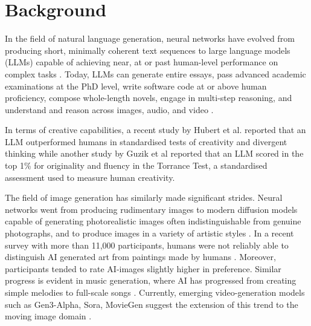 \section{Background}

In the field of natural language generation, neural networks have evolved from producing short, minimally coherent text sequences \cite{Bengio2003-xn, Sutskever2011-ne, Graves2013-yv} to large language models (LLMs) capable of achieving near, at or past human-level performance on complex tasks \cite{Vaswani2017-pb, Brown2020-js, Thoppilan2022-jf, OpenAI2023-lt, Anthropic2024-tc, DeepSeek-AI2025-ai, Gemini-Team2024-wk}. Today, LLMs can generate entire essays, pass advanced academic examinations at the PhD level, write software code at or above human proficiency, compose whole-length novels, engage in multi-step reasoning, and understand and reason across images, audio, and video \cite{Gemini-Team2023-ux, OpenAI2024-em}. 

In terms of creative capabilities, a recent study by Hubert et al. reported that an LLM outperformed humans in standardised tests of creativity and divergent thinking \cite{Hubert2024-kv} while another study by Guzik et al \cite{Guzik2023-cl} reported that an LLM scored in the top 1\% for originality and fluency in the Torrance Test, a standardised assessment used to measure human creativity. 

The field of image generation has similarly made significant strides. Neural networks went from producing rudimentary images \cite{Goodfellow2014-jz, Mordvintsev2015-oz} to modern diffusion models capable of generating photorealistic images often indistinguishable from genuine photographs, and to produce images in a variety of artistic styles \cite{Ramesh2021-xb, Rombach2021-wf, Ho2020-zj, OpenAI2021-te, Nichol2021-ne, Zhang2023-by}. In a recent survey with more than 11,000 participants, humans were not reliably able to distinguish AI generated art from paintings made by humans \cite{Alexander2024-pz}. Moreover, participants tended to rate AI-images slightly higher in preference. Similar progress is evident in music generation, where AI has progressed from creating simple melodies \cite{Huang2018-pc, Dhariwal2020-au, Roberts2019-ym} to full-scale songs \cite{Copet2023-mh, Suno2024-wa, Udio2024-rc}. Currently, emerging video-generation models such as Gen3-Alpha, Sora, MovieGen suggest the extension of this trend to the moving image domain \cite{Runway2024-zs, Polyak2024-lh, OpenAI2024-ua}.

